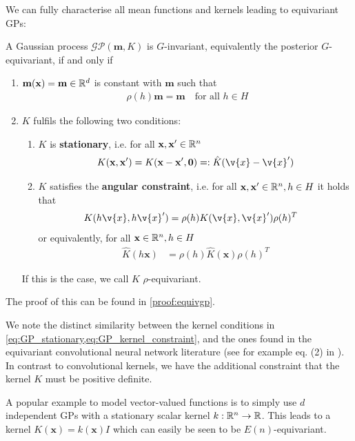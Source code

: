 We can fully characterise all mean functions and kernels leading to equivariant GPs: \begin{theorem} \label{thm:equivgp} A Gaussian process $\mathcal{GP}(\mathbf{m},K)$ is $G$-invariant, equivalently the posterior $G$-equivariant, if and only if \begin{enumerate} \item $\mathbf{m}(\mathbf{x})=\mathbf{m}\in\mathbb{R}^d$ is constant with $\mathbf{m}$ such that \begin{align} \label{eq:m_invariant_under_rho} \rho(h)\mathbf{m}=\mathbf{m}\quad\text{for all } h\in H \end{align} \item $K$ fulfils the following two conditions: \begin{enumerate} \item $K$ is \textbf{stationary}, i.e. for all $\mathbf{x},\mathbf{x}'\in\mathbb{R}^n$ \begin{align} \label{eq:GP_stationary} K(\mathbf{x},\mathbf{x}')=K(\mathbf{x}-\mathbf{x}', \mathbf{0}) =: \hat{K}(\v{x} - \v{x}') \end{align} \item $K$ satisfies the \textbf{angular constraint}, i.e. for all $\mathbf{x},\mathbf{x}'\in\mathbb{R}^n,h\in H$ it holds that \begin{align} \label{eq:GP_kernel_constraint} K(h \v{x}, h \v{x}') &= \rho(h) K(\v{x}, \v{x}')\rho(h)^T \end{align} or equivalently, for all $\mathbf{x}\in\mathbb{R}^n,h\in H$ \begin{align} \hat{K}(h\mathbf{x})&=\rho(h)\hat{K}(\mathbf{x})\rho(h)^T \end{align} \end{enumerate} If this is the case, we call $K$ $\rho$-equivariant.
	\end{enumerate}
\end{theorem}
The proof of this can be found in \cref{proof:equivgp}.

We note the distinct similarity between the kernel conditions in \cref{eq:GP_stationary,eq:GP_kernel_constraint}, and the ones found in the equivariant convolutional neural network literature (see for example eq.
(2) in \textcite{E2Steerable}).
In contrast to convolutional kernels, we have the additional constraint that the kernel $K$ must be positive definite.

A popular example to model vector-valued functions is to simply use $d$ independent GPs with a stationary scalar kernel $k:\mathbb{R}^n\to\mathbb{R}$.
This leads to a kernel $K(\mathbf{x})=k(\mathbf{x})I$ which can easily be seen to be $E(n)$-equivariant.

